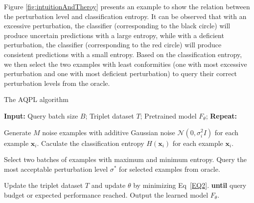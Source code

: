 \documentclass[letterpaper]{article} %
\begin{document}
Figure \ref{fig:intuitionAndTheroy} presents an example to show the relation between the perturbation level and classification entropy. It can be observed that with an excessive perturbation, the classifier (corresponding to the black circle) will produce uncertain predictions with a large entropy, while with a deficient perturbation, the classifier (corresponding to the red circle) will produce consistent predictions with a small entropy. Based on the classification entropy, we then select the two examples with least conformities (one with most excessive perturbation and one with most deficient perturbation) to query their correct perturbation levels from the oracle.

\begin{algorithm}[t]

	\caption{The AQPL algorithm}
	\label{alg:AQPL}
	\begin{algorithmic}[1]
		\STATE \textbf{Input:}
		\STATE \quad Query batch size $B$;
		\STATE \quad Triplet dataset $T$;
		\STATE \quad Pretrained model $F_\theta$;
		\STATE \textbf{Repeat:}

		\STATE \quad Generate $M$ noise examples with additive Gaussian noise $\mathcal{N}(0,\sigma_i^2 I)$ for each example $\mathbf{x}_i$.
		\STATE \quad Caculate the classification entropy $H(\mathbf{x}_i)$ for each example $\mathbf{x}_i$.

		\STATE \quad Select two batches of examples with maximum and minimum entropy.
		\STATE \quad Query the most acceptable perturbation level $\sigma^*$ for selected examples from oracle.


		\STATE \quad Update the triplet dataset $T$ and update $\theta$ by minimizing Eq~\ref{EQ2}.
		\STATE \textbf{until} query budget or expected performance reached.
		\STATE Output the learned model $F_\theta$.

	\end{algorithmic}
\end{algorithm}
\end{document}
